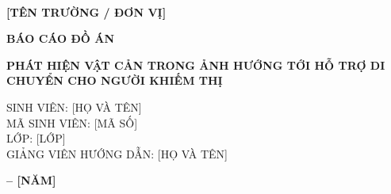 \begin{titlepage}
\thispagestyle{empty}
\begin{center}
{\bfseries\fontsize{14pt}{21pt}\\[0.25cm]
[TÊN TRƯỜNG / ĐƠN VỊ]}\par
\vspace{3cm}
\vspace{1.5cm}
{\bfseries\fontsize{18pt}{27pt}\selectfont BÁO CÁO ĐỒ ÁN}\par
\vspace{0.8cm}
{\bfseries\fontsize{14pt}{21pt}\selectfont
PHÁT HIỆN VẬT CẢN TRONG ẢNH HƯỚNG TỚI HỖ TRỢ DI CHUYỂN CHO NGƯỜI KHIẾM THỊ}\par
\vspace{2cm}
{\fontsize{13pt}{19.5pt}\selectfont
SINH VIÊN: [HỌ VÀ TÊN]\\
MÃ SINH VIÊN: [MÃ SỐ]\\
LỚP: [LỚP]\\
GIẢNG VIÊN HƯỚNG DẪN: [HỌ VÀ TÊN]}\par
\vfill
{\bfseries\fontsize{13pt}{19.5pt} -- [NĂM]}\par
\end{center}
\end{titlepage}

